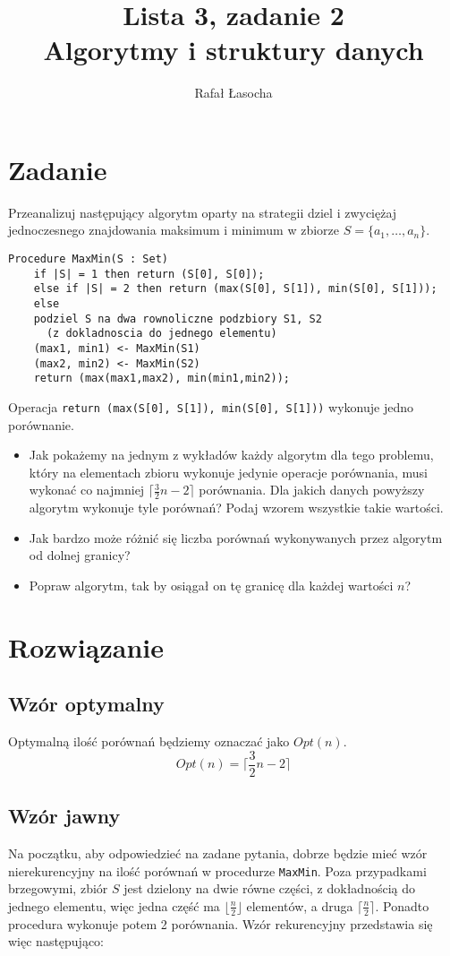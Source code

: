 \documentclass[a4paper,11pt]{article}
\title{
  \textbf{Lista 3, zadanie 2}\\
  {\Large Algorytmy i struktury danych}
}
\author{Rafał Łasocha}
\begin{document}
\maketitle

\section{Zadanie}
Przeanalizuj następujący algorytm oparty na strategii dziel i zwyciężaj jednoczesnego znajdowania maksimum i minimum w zbiorze $S = \{a_1, \dots, a_n\}$.

\begin{lstlisting}[frame=single]
 Procedure MaxMin(S : Set)
    if |S| = 1 then return (S[0], S[0]);
    else if |S| = 2 then return (max(S[0], S[1]), min(S[0], S[1]));
    else
	podziel S na dwa rownoliczne podzbiory S1, S2
	  (z dokladnoscia do jednego elementu)
	(max1, min1) <- MaxMin(S1)
	(max2, min2) <- MaxMin(S2)
	return (max(max1,max2), min(min1,min2));
\end{lstlisting}
Operacja \texttt{return (max(S[0], S[1]), min(S[0], S[1]))} wykonuje jedno porównanie.
\begin{itemize}
 \item Jak pokażemy na jednym z wykładów każdy algorytm dla tego problemu,
 który na elementach zbioru wykonuje jedynie operacje porównania, musi wykonać co najmniej $\lceil \frac{3}{2} n - 2 \rceil$ porównania.
 Dla jakich danych powyższy algorytm wykonuje tyle porównań? Podaj wzorem wszystkie takie wartości.
 \item Jak bardzo może różnić się liczba porównań wykonywanych przez algorytm od dolnej granicy?
 \item Popraw algorytm, tak by osiągał on tę granicę dla każdej wartości $n$?
\end{itemize}



\section{Rozwiązanie}

\subsection{Wzór optymalny}
Optymalną ilość porównań będziemy oznaczać jako $Opt(n)$.
\begin{equation}
 Opt(n) = \lceil \frac{3}{2} n - 2 \rceil
\end{equation}

\subsection{Wzór jawny}
Na początku, aby odpowiedzieć na zadane pytania, dobrze będzie mieć wzór nierekurencyjny na ilość porównań w procedurze \texttt{MaxMin}.
Poza przypadkami brzegowymi, zbiór $S$ jest dzielony na dwie równe części, z dokładnością do jednego elementu, więc jedna część ma 
$\lfloor \frac{n}{2} \rfloor$ elementów, a druga $\lceil \frac{n}{2} \rceil$. Ponadto procedura wykonuje potem 2 porównania.
Wzór rekurencyjny przedstawia się więc następująco:
\end{document}
